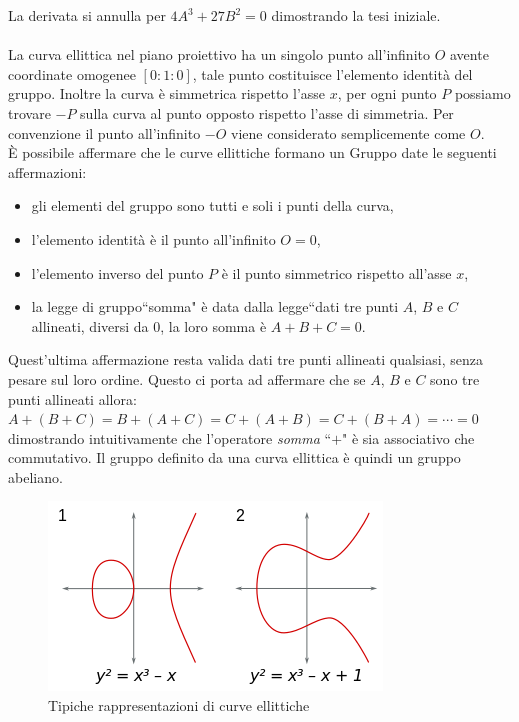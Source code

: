 \documentclass[a4paper,12pt]{tesiinfo}
\begin{document}
La derivata si annulla per $4A^3+27B^2 = 0$ dimostrando la tesi iniziale.\\
\\
La curva ellittica nel piano proiettivo ha un singolo punto all'infinito $O$ avente coordinate omogenee $[0:1:0]$, tale punto costituisce l'elemento identit\`a del gruppo. Inoltre la curva \`e simmetrica rispetto l'asse $x$, per ogni punto $P$ possiamo trovare $-P$ sulla curva al punto opposto rispetto l'asse di simmetria. Per convenzione il punto all'infinito $-O$ viene considerato semplicemente come $O$.\\
\`E possibile affermare che le curve ellittiche formano un Gruppo date le seguenti affermazioni:
\begin{itemize}
  \item gli elementi del gruppo sono tutti e soli i punti della curva,
  \item l'elemento identit\`a \`e il punto all'infinito $O = 0$,
  \item l'elemento inverso del punto $P$ \`e il punto simmetrico rispetto all'asse $x$,
  \item la legge di gruppo``somma" \`e data dalla legge``dati tre punti $A$, $B$ e $C$ allineati, diversi da $0$, la loro somma \`e $A+B+C=0$.
\end{itemize}
Quest'ultima affermazione resta valida dati tre punti allineati qualsiasi, senza pesare sul loro ordine. Questo ci porta ad affermare che se $A$, $B$ e $C$ sono tre punti allineati allora:\\
$A+(B+C)=B+(A+C)=C+(A+B)=C+(B+A)=\cdots = 0$\\
dimostrando intuitivamente che l'operatore \textit{somma} ``$+$" \`e sia associativo che commutativo. Il gruppo definito da una curva ellittica \`e quindi un gruppo abeliano.
\begin{figure}[H]
  \includegraphics[width=.8\textwidth,center]{commonEC}
  \caption{Tipiche rappresentazioni di curve ellittiche}
\end{figure}
\end{document}

